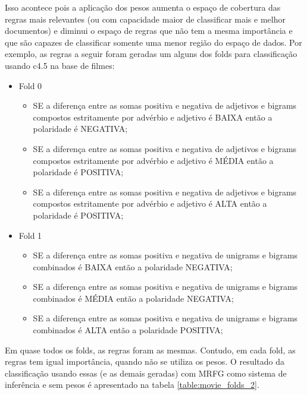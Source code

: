 \documentclass[template.tex]{subfiles}
\begin{document}
Isso acontece pois a aplicação dos pesos aumenta o espaço de cobertura das regras mais relevantes (ou com capacidade maior de classificar mais e melhor documentos) e diminui o espaço de regras que não tem a mesma importância e que são capazes de classificar somente uma menor região do espaço de dados. Por exemplo, as regras a seguir foram geradas um alguns dos folds para classificação usando c4.5 na base de filmes:

\begin{itemize}
\item Fold 0
\begin{itemize}
\item SE a diferença entre as somas positiva e negativa de adjetivos e bigrams compostos estritamente por advérbio e adjetivo é BAIXA então a polaridade é NEGATIVA;
\item SE a diferença entre as somas positiva e negativa de adjetivos e bigrams compostos estritamente por advérbio e adjetivo é MÉDIA então a polaridade é POSITIVA;
\item SE a diferença entre as somas positiva e negativa de adjetivos e bigrams compostos estritamente por advérbio e adjetivo é ALTA então a polaridade é POSITIVA;
\end{itemize}
\item Fold 1
\begin{itemize}
\item SE a diferença entre as somas positiva e negativa de unigrams e bigrams combinados é BAIXA então a polaridade NEGATIVA;
\item SE a diferença entre as somas positiva e negativa de unigrams e bigrams combinados é MÉDIA então a polaridade NEGATIVA;
\item SE a diferença entre as somas positiva e negativa de unigrams e bigrams combinados é ALTA então a polaridade POSITIVA;
\end{itemize}
\end{itemize}

Em quase todos os folds, as regras foram as mesmas. Contudo, em cada fold, as regras tem igual importância, quando não se utiliza os pesos. O resultado da classificação usando essas (e as demais geradas) com MRFG como sistema de inferência e sem pesos é apresentado na tabela \ref{table:movie_folds_2}.
\end{document}
